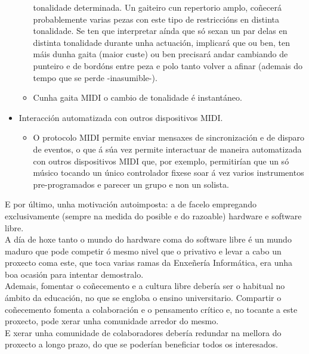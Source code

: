 \begin{itemize}
\begin{itemize}
               tonalidade determinada. Un gaiteiro cun repertorio amplo,
               coñecerá probablemente varias pezas con este tipo de
               restriccións en distinta tonalidade. Se ten que interpretar
               aínda que só sexan un par delas en distinta tonalidade durante
               unha actuación, implicará que ou ben, ten máis dunha gaita
               (maior custe) ou ben precisará andar cambiando de punteiro e de
               bordóns entre peza e polo tanto volver a afinar (ademais do
               tempo que se perde -inasumible-).
         \item Cunha gaita MIDI o cambio de tonalidade é instantáneo.
        \end{itemize}
  \item Interacción automatizada con outros dispositivos MIDI.
        \begin{itemize}
         \item O protocolo MIDI permite enviar mensaxes de sincronización e de
               disparo de eventos, o que á súa vez permite interactuar de
               maneira automatizada con outros dispositivos MIDI que, por
               exemplo, permitirían que un só músico tocando un único
               controlador fixese soar á vez varios instrumentos
               pre-programados e parecer un grupo e non un solista.
        \end{itemize}
 \end{itemize}

 E por último, unha motivación autoimposta: a de facelo empregando
 exclusivamente (sempre na medida do posible e do razoable) hardware e software
 libre. \\

 A día de hoxe tanto o mundo do hardware coma do software libre é un mundo
 maduro que pode competir ó mesmo nivel que o privativo e levar a cabo un
 proxecto coma este, que toca varias ramas da Enxeñería Informática, era unha
 boa ocasión para intentar demostralo. \\

 Ademais, fomentar o coñecemento e a cultura libre debería ser o habitual no
 ámbito da educación, no que se engloba o ensino universitario. Compartir o
 coñecemento fomenta a colaboración e o pensamento crítico e, no tocante a este
 proxecto, pode xerar unha comunidade arredor do mesmo. \\

 E xerar unha comunidade de colaboradores debería redundar na mellora do
 proxecto a longo prazo, do que se poderían beneficiar todos os interesados. \\

